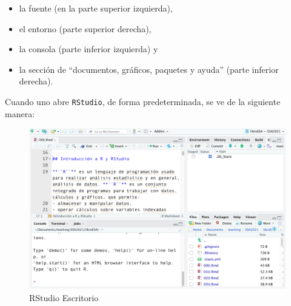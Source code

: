 \documentclass[
]{article}
\begin{document}
\begin{itemize}
\item
  la fuente (en la parte superior izquierda),
\item
  el entorno (parte superior derecha),
\item
  la consola (parte inferior izquierda) y
\item
  la sección de ``documentos, gráficos, paquetes y ayuda'' (parte inferior derecha).
\end{itemize}

Cuando uno abre \texttt{RStudio}, de forma predeterminada, se ve de la siguiente manera:

\begin{figure}

{\centering \includegraphics[width=0.8\linewidth]{imagenes/rstudio_entorno} 

}

\caption{RStudio Escritorio}\label{fig:unnamed-chunk-139}
\end{figure}
\end{document}
